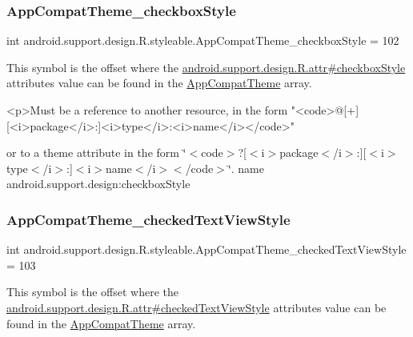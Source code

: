 \subsubsection{\texorpdfstring{App\+Compat\+Theme\+\_\+checkbox\+Style}{AppCompatTheme\_checkboxStyle}}
{\footnotesize\ttfamily int android.\+support.\+design.\+R.\+styleable.\+App\+Compat\+Theme\+\_\+checkbox\+Style = 102\hspace{0.3cm}{\ttfamily [static]}}

This symbol is the offset where the \hyperlink{classandroid_1_1support_1_1design_1_1R_1_1attr_a872314306a26ac20bfcc115120e40dd5}{android.\+support.\+design.\+R.\+attr\#checkbox\+Style} attribute\textquotesingle{}s value can be found in the \hyperlink{classandroid_1_1support_1_1design_1_1R_1_1styleable_afb351dc8de20cbd4c89abe360373010c}{App\+Compat\+Theme} array.

\begin{DoxyVerb}      <p>Must be a reference to another resource, in the form "<code>@[+][<i>package</i>:]<i>type</i>:<i>name</i></code>"
\end{DoxyVerb}
 or to a theme attribute in the form \char`\"{}$<$code$>$?\mbox{[}$<$i$>$package$<$/i$>$\+:\mbox{]}\mbox{[}$<$i$>$type$<$/i$>$\+:\mbox{]}$<$i$>$name$<$/i$>$$<$/code$>$\char`\"{}.  name android.\+support.\+design\+:checkbox\+Style \mbox{\label{classandroid_1_1support_1_1design_1_1R_1_1styleable_a2c04271b29c4402ba6651dc55d3c3730}} 
\subsubsection{\texorpdfstring{App\+Compat\+Theme\+\_\+checked\+Text\+View\+Style}{AppCompatTheme\_checkedTextViewStyle}}
{\footnotesize\ttfamily int android.\+support.\+design.\+R.\+styleable.\+App\+Compat\+Theme\+\_\+checked\+Text\+View\+Style = 103\hspace{0.3cm}{\ttfamily [static]}}

This symbol is the offset where the \hyperlink{classandroid_1_1support_1_1design_1_1R_1_1attr_a434948ae3f1dd8ba90cfe1ebc224b6cc}{android.\+support.\+design.\+R.\+attr\#checked\+Text\+View\+Style} attribute\textquotesingle{}s value can be found in the \hyperlink{classandroid_1_1support_1_1design_1_1R_1_1styleable_afb351dc8de20cbd4c89abe360373010c}{App\+Compat\+Theme} array.

